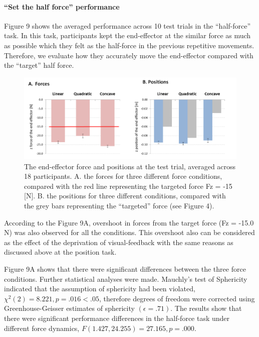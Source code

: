 \paragraph{“Set the half force” performance}
Figure 9 shows the averaged performance across 10 test trials in the “half-force” task. In this task, participants kept the end-effector at the similar force as much as possible which they felt as the half-force in the previous repetitive movements. Therefore, we evaluate how they accurately move the end-effector compared with the “target” half force. 
%
\begin{figure}
	\centering
	\includegraphics[width=.7\textwidth]{Chie/figs/Figure9.png}
	\caption{The end-effector force and positions at the test trial, averaged across 18 participants. 
		A. the forces for three different force conditions, compared with the red line representing the targeted force Fz = -15 [N].  B. the positions for three different conditions, compared with the grey bars representing the “targeted” force (see Figure 4).}
	\label{half-force}
\end{figure}
According to the Figure 9A, overshoot in forces  from the target force (Fz = -15.0 N) was also observed for  all the conditions. This overshoot also can be considered as the effect of the deprivation of visual-feedback with the same reasons as discussed above at the position task.

Figure 9A shows that there were significant differences between the three force conditions. Further statistical analyses were made. Mauchly’s test of Sphericity indicated that the assumption of sphericity had been violated, $\chi^2 (2) = 8.221, p = .016 < .05$, therefore degrees of freedom were corrected using Greenhouse-Geisser estimates of sphericity $(\epsilon = .71)$. The results show that there were significant performance differences in the half-force task under different force dynamics, $F(1.427, 24.255) = 27.165, p = .000$.

